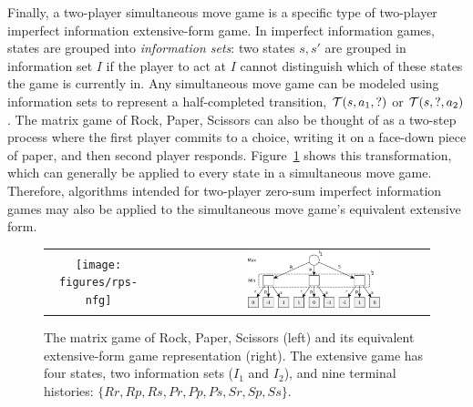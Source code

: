Finally, a two-player simultaneous move game is a specific type of two-player imperfect information extensive-form game.
In imperfect information
games, states are grouped into {\it information sets}: two states $s, s'$ are grouped in information set $I$ if the player
to act at $I$ cannot distinguish which of these states the game is currently in. Any simultaneous move game can be modeled
using information sets to represent a half-completed transition, \ie $\mathcal{T}(s, a_1, ?)$ or $\mathcal{T}(s, ?, a_2)$.
The matrix game of Rock, Paper, Scissors can also be thought of as a two-step process where the first player commits
to a choice, writing it on a face-down piece of paper, and then second player responds. Figure~\ref{fig:rps-equiv} shows this
transformation, which can generally be applied to every state in a simultaneous move game.
Therefore, algorithms intended for two-player zero-sum imperfect information games may also be applied to the
simultaneous move game's equivalent extensive form.

\begin{figure}
\begin{center}
\begin{tabular}{ccc}
\texttt{[image: figures/rps-nfg]} & ~~~~~ & \includegraphics[width=0.6\textwidth]{figures/rps-new} \\
\end{tabular}
\end{center}
\caption{The matrix game of Rock, Paper, Scissors (left) and its equivalent extensive-form game representation (right). The extensive
game has four states, two information sets ($I_1$ and $I_2$),
and nine terminal histories: $\{ Rr, Rp, Rs, Pr, Pp, Ps, Sr, Sp, Ss \}$. \label{fig:rps-equiv}}
\end{figure}


